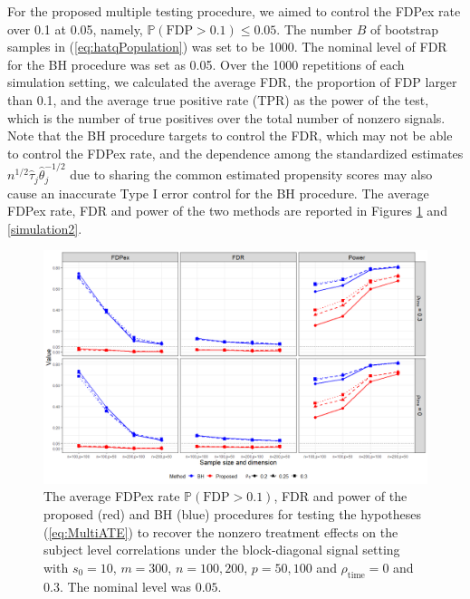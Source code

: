 \documentclass[12pt]{article}
\theoremstyle{definition}
\newcommand{\bbeta}  {\boldsymbol{\beta}}
\begin{document}
For the proposed multiple testing procedure, we aimed to control the FDPex rate over 0.1 at 0.05, namely, $\mathbb{P}(\mbox{FDP} > 0.1) \leq 0.05$. 
The number $B$ of bootstrap samples in (\ref{eq:hatqPopulation}) was set to be 1000. 
The nominal level of FDR for the BH procedure was set as 0.05. 
Over the 1000 repetitions of each simulation setting, we calculated the average FDR, the proportion of FDP larger than 0.1, and the average true positive rate (TPR) as the power of the test, which is the number of true positives over the total number of nonzero signals. 
Note that the BH procedure targets to control the FDR, which may not be able to control the FDPex rate, and the dependence among the standardized estimates $n^{1/2}\hat{\tau}_j\hat{\theta}_{j}^{-1/2}$ due to sharing the common estimated propensity scores may also cause an inaccurate Type I error control for the BH procedure.
The average FDPex rate, FDR and power of the two methods are reported in Figures \ref{simulation1} and \ref{simulation2}. 
\begin{figure}[t]
	\centering
	\includegraphics[width=\linewidth]{plot-correlation-block.png}
	\caption{The average FDPex rate $\mathbb{P}(\mbox{FDP} > 0.1)$, FDR and power of the proposed (red) and BH (blue) procedures for testing the hypotheses (\ref{eq:MultiATE}) to recover the nonzero treatment effects on the subject level correlations under the block-diagonal signal setting with $s_0 = 10$, $m = 300$, $n = 100, 200$, $p = 50, 100$ and $\rho_{\mathrm{\scriptstyle time}} = 0$ and $0.3$. The nominal level was $0.05$.}
	\label{simulation1}
\end{figure}
\end{document}
